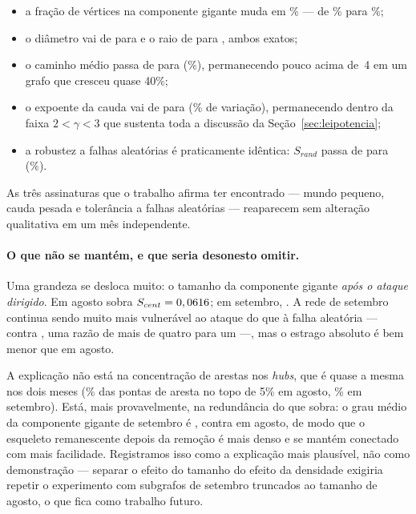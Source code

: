 \documentclass[sigconf]{webmedia}
\begin{document}
\begin{itemize}[nosep]
  \item a fração de vértices na componente gigante muda em
        \setVarCG{}\% --- de \fracCG{}\% para \setCG{}\%;
  \item o diâmetro vai de \diametro{} para \setDiam{} e o raio de
        \raio{} para \setRaio{}, ambos exatos;
  \item o caminho médio passa de \agoLdez{} para \setL{}
        (\setVarL{}\%), permanecendo pouco acima de~4 em um grafo que
        cresceu quase 40\%;
  \item o expoente da cauda vai de \plGamma{} para \setGamma{}
        (\setVarGamma{}\% de variação), permanecendo dentro da faixa
        $2<\gamma<3$ que sustenta toda a discussão da
        Seção~\ref{sec:leipotencia};
  \item a robustez a falhas aleatórias é praticamente idêntica:
        $S_{rand}$ passa de \agoSrandDez{} para \setSrand{}
        (\setVarSrand{}\%).
\end{itemize}

\noindent
As três assinaturas que o trabalho afirma ter encontrado --- mundo
pequeno, cauda pesada e tolerância a falhas aleatórias --- reaparecem
sem alteração qualitativa em um mês independente.

\paragraph{O que não se mantém, e que seria desonesto omitir.} Uma
grandeza se desloca muito: o tamanho da componente gigante \emph{após o
ataque dirigido}. Em agosto sobra $S_{cent} = 0,0616{}$; em setembro,
\setScent{}. A rede de setembro continua sendo muito mais vulnerável ao
ataque do que à falha aleatória --- \setScent{} contra \setSrand{}, uma
razão de mais de quatro para um ---, mas o estrago absoluto é bem menor
que em agosto.

A explicação não está na concentração de arestas nos \textit{hubs}, que
é quase a mesma nos dois meses (\concAgo{}\% das pontas de aresta no
topo de 5\% em agosto, \concSet{}\% em setembro). Está, mais
provavelmente, na redundância do que sobra: o grau médio da componente
gigante de setembro é \grauMedioCGset{}, contra \grauMedioCG{} em
agosto, de modo que o esqueleto remanescente depois da remoção é mais
denso e se mantém conectado com mais facilidade. Registramos isso como a
explicação mais plausível, não como demonstração --- separar o efeito do
tamanho do efeito da densidade exigiria repetir o experimento com
subgrafos de setembro truncados ao tamanho de agosto, o que fica como
trabalho futuro.
\end{document}
